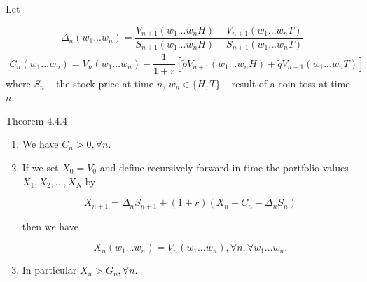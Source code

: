 \documentclass[c, dvipsnames, 8pt]{beamer}
\begin{document}
\begin{frame}[shrink=5]
\frametitle{\insertsection} 
\framesubtitle{\insertsubsection} 

Let

\begin{equation}\label{key}
\Delta_n(w_1...w_n) = \dfrac{V_{n+1}(w_1...w_nH) -V_{n+1}(w_1...w_nT)   }{S_{n+1}(w_1...w_nH) -S_{n+1}(w_1...w_nT) }
\end{equation}
\begin{multline}\label{key}
C_n(w_1...w_n) = V_n(w_1...w_n) - \dfrac{1}{1+r  } [\tilde{p}V_{n+1}(w_1...w_nH)  + \tilde{q}V_{n+1}(w_1...w_nT) ]
\end{multline}
where  $S_n$ -- the stock price at time $n$, $w_n\in \{H,T\}$ -- result of a coin toss at time $n$. 



\begin{block}{Theorem 4.4.4}
\begin{enumerate}
	\item 
 We have $C_n>0, \forall n$.


\item  If we set $X_0 = V_0$ and define recursively forward in time the portfolio values $X_1, X_2,..., X_N$ by

\begin{equation}\label{key}
X_{n+1} = \Delta_n S_{n+1} + (1+r)(X_n-C_n-\Delta_nS_n)
\end{equation}

then we have

\begin{equation}\label{key}
X_n(w_1...w_n) = V_n(w_1...w_n), \forall n, \forall w_1...w_n.
\end{equation}

\item  In particular $X_n > G_n, \forall n.$
\end{enumerate}
\end{block}
	
\end{frame}
	
\end{document}

